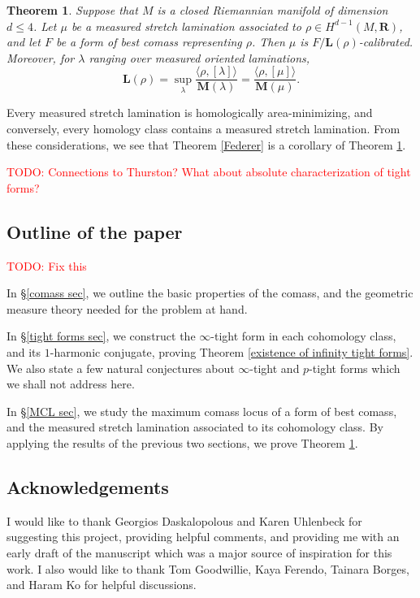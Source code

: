 \documentclass[reqno,11pt]{amsart}
\newcommand{\RR}{\mathbf{R}}
\newcommand{\Mass}{\mathbf M}
\newcommand{\Comass}{\mathbf L}
\newtheorem{mainthm}{Theorem}
\theoremstyle{definition}
\numberwithin{equation}{section}
\newcommand\todo[1]{\textcolor{red}{TODO: #1}}
\begin{document}
\begin{mainthm}\label{lams are calibrated}
Suppose that $M$ is a closed Riemannian manifold of dimension $d \leq 4$.
Let $\mu$ be a measured stretch lamination associated to $\rho \in H^{d - 1}(M, \RR)$, and let $F$ be a form of best comass representing $\rho$.
Then $\mu$ is $F/\Comass(\rho)$-calibrated.
Moreover, for $\lambda$ ranging over measured oriented laminations,
\begin{equation}\label{duality between stable and comass}
\Comass(\rho) = \sup_\lambda \frac{\langle \rho, [\lambda]\rangle}{\Mass(\lambda)} = \frac{\langle \rho, [\mu]\rangle}{\Mass(\mu)}.
\end{equation}
\end{mainthm}

Every measured stretch lamination is homologically area-minimizing, and conversely, every homology class contains a measured stretch lamination.
From these considerations, we see that Theorem \ref{Federer} is a corollary of Theorem \ref{lams are calibrated}.

\todo{Connections to Thurston? What about absolute characterization of tight forms?}


\subsection{Outline of the paper}
\todo{Fix this}

In \S\ref{comass sec}, we outline the basic properties of the comass, and the geometric measure theory needed for the problem at hand.

In \S\ref{tight forms sec}, we construct the $\infty$-tight form in each cohomology class, and its $1$-harmonic conjugate, proving Theorem \ref{existence of infinity tight forms}.
We also state a few natural conjectures about $\infty$-tight and $p$-tight forms which we shall not address here.

In \S\ref{MCL sec}, we study the maximum comass locus of a form of best comass, and the measured stretch lamination associated to its cohomology class.
By applying the results of the previous two sections, we prove Theorem \ref{lams are calibrated}.


\subsection{Acknowledgements}
I would like to thank Georgios Daskalopolous and Karen Uhlenbeck for suggesting this project, providing helpful comments, and providing me with an early draft of the manuscript \cite{daskalopoulos2023} which was a major source of inspiration for this work.
I also would like to thank Tom Goodwillie, Kaya Ferendo, Tainara Borges, and Haram Ko for helpful discussions.
\end{document}
